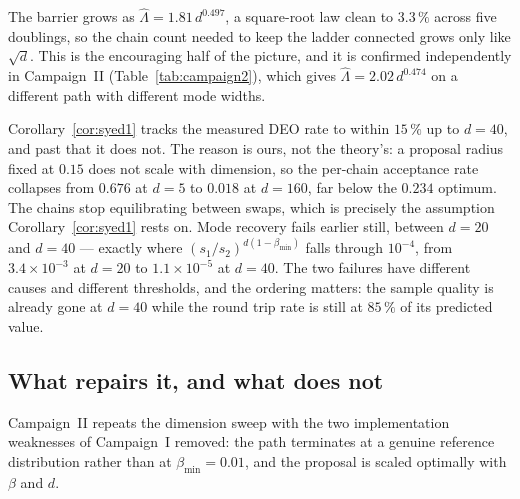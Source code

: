 The barrier grows as $\hat\Lambda=1.81\,d^{0.497}$, a square-root law clean to
$3.3\,\%$ across five doublings, so the chain count needed to keep the ladder
connected grows only like $\sqrt d$. This is the encouraging half of the picture,
and it is confirmed independently in Campaign~II
(Table~\ref{tab:campaign2}), which gives $\hat\Lambda=2.02\,d^{0.474}$ on a
different path with different mode widths.

Corollary~\ref{cor:syed1} tracks the measured DEO rate to within $15\,\%$ up to
$d=40$, and past that it does not. The reason is ours, not the theory's: a
proposal radius fixed at $0.15$ does not scale with dimension, so the per-chain
acceptance rate collapses from $0.676$ at $d=5$ to $0.018$ at $d=160$, far below
the $0.234$ optimum. The chains stop equilibrating between swaps, which is
precisely the assumption Corollary~\ref{cor:syed1} rests on. Mode recovery fails
earlier still, between $d=20$ and $d=40$ --- exactly where
$(s_1/s_2)^{d(1-\beta_{\min})}$ falls through $10^{-4}$, from
$3.4\times10^{-3}$ at $d=20$ to $1.1\times10^{-5}$ at $d=40$. The two failures
have different causes and different thresholds, and the ordering matters: the
sample quality is already gone at $d=40$ while the round trip rate is still at
$85\,\%$ of its predicted value.

\subsection{What repairs it, and what does not}
\label{sec:results-repair}

Campaign~II repeats the dimension sweep with the two implementation weaknesses
of Campaign~I removed: the path terminates at a genuine reference distribution
rather than at $\beta_{\min}=0.01$, and the proposal is scaled optimally with
$\beta$ and $d$.

